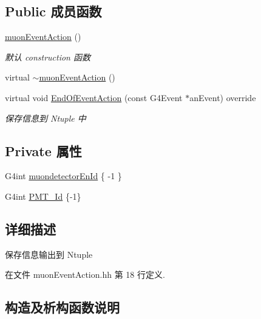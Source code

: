 \subsection*{Public 成员函数}
\begin{DoxyCompactItemize}
\item 
\hyperlink{classmuonEventAction_a5584cb4df883c49fb98b082aacf0a269}{muon\+Event\+Action} ()
\begin{DoxyCompactList}\small\item\em 默认 construction 函数 \end{DoxyCompactList}\item 
virtual \hyperlink{classmuonEventAction_ae268609426bf99b1459f72e21215fdc4}{$\sim$muon\+Event\+Action} ()
\item 
virtual void \hyperlink{classmuonEventAction_a674e82851a04669f19294aae5e4a69e6}{End\+Of\+Event\+Action} (const G4\+Event $\ast$an\+Event) override
\begin{DoxyCompactList}\small\item\em 保存信息到 Ntuple 中 \end{DoxyCompactList}\end{DoxyCompactItemize}
\subsection*{Private 属性}
\begin{DoxyCompactItemize}
\item 
G4int \hyperlink{classmuonEventAction_a16fc4814b4d56184e4e458b5b9c5b8b7}{muondetector\+En\+Id} \{ -\/1 \}
\item 
G4int \hyperlink{classmuonEventAction_a569d9e868f1be3db60bcc7ef512a3b7f}{P\+M\+T\+\_\+\+Id} \{-\/1\}
\end{DoxyCompactItemize}


\subsection{详细描述}
保存信息输出到 Ntuple 

在文件 muon\+Event\+Action.\+hh 第 18 行定义.



\subsection{构造及析构函数说明}
\mbox{\label{classmuonEventAction_a5584cb4df883c49fb98b082aacf0a269}} 
